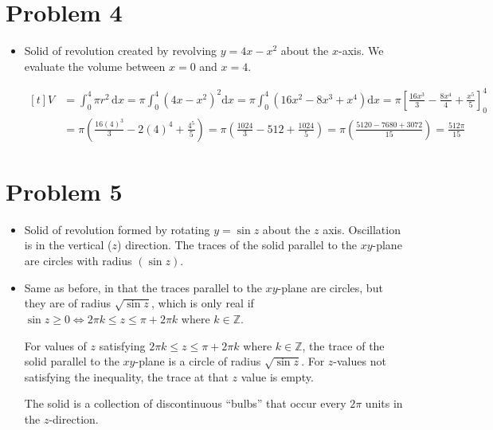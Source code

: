 \documentclass{article}
\newcommand*{\problem}[1]{\section*{Problem #1}}
\begin{document}
\fontsize{12pt}{12pt}\selectfont
\setlength{\abovedisplayskip}{\abovedisplayskip/2}
\setlength{\belowdisplayskip}{\belowdisplayskip/2}
\setlength{\parindent}{0pt}
\setlength{\parskip}{2ex plus 0.5ex minus 0.2ex}



\problem{4}

\begin{itemize}
\item[(b)]
	Solid of revolution created by revolving $y=4x-x^2$ about the $x$-axis. We evaluate the volume between $x=0$ and $x=4$.

	$\begin{aligned}[t]
		V
		&=\int_{0}^{4}\pi r^2\,\mathrm{d}x
		=\pi\int_{0}^{4}\left( 4x-x^2 \right)^2\mathrm{d}x
		=\pi \int_{0}^{4}\left( 16x^2-8x^3+x^4 \right)\mathrm{d}x
		=\pi\left[\frac{16x^3}{3}-\frac{8x^4}{4}+\frac{x^5}{5}\right]_{0}^{4}\\
		&=\pi\left(\frac{16(4)^3}{3}-2(4)^4+\frac{4^5}{5}\right)
		=\pi\left(\frac{1024}{3}-512+\frac{1024}{5}\right)
		=\pi \left( \frac{5120-7680+3072}{15} \right)
		=\boxed{\frac{512\pi}{15}}
	\end{aligned}$
\end{itemize}

\problem{5}
\begin{itemize}
\item[(a)] Solid of revolution formed by rotating $y=\sin z$ about the $z$ axis. Oscillation is in the vertical ($z$) direction. The traces of the solid parallel to the $xy$-plane are circles with radius $(\sin z)$.

\item[(b)] Same as before, in that the traces parallel to the $xy$-plane are circles, but they are of radius $\sqrt{\sin z}$, which is only real if $\sin z\geq0 \iff 2\pi k\leq z\leq \pi+2\pi k$ where $k\in\mathbb Z$.

For values of $z$ satisfying $2\pi k\leq z\leq \pi+2\pi k$ where $k\in\mathbb Z$, the trace of the solid parallel to the $xy$-plane is a circle of radius $\sqrt{\sin z}$. For $z$-values not satisfying the inequality, the trace at that $z$ value is empty.

The solid is a collection of discontinuous ``bulbs'' that occur every $2\pi$ units in the $z$-direction.

\end{itemize}
\end{document}
